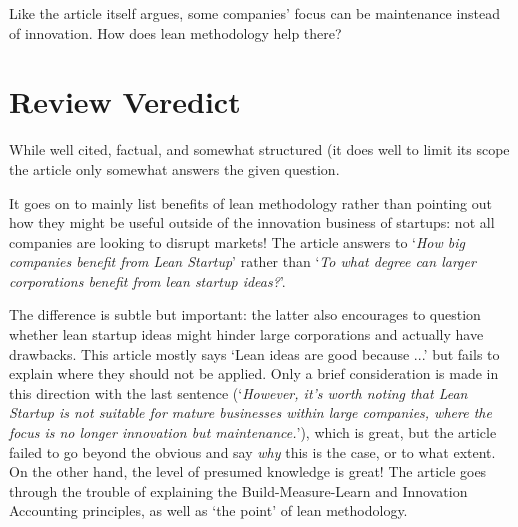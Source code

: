 \documentclass[conference]{IEEEtran}
\begin{document}
    Like the article itself argues, some companies' focus can be maintenance instead
    of innovation.
    How does lean methodology help there? \\

    \section{Review Veredict}

    While well cited, factual, and somewhat structured (it does well to limit its scope the article
    only somewhat answers the given question.

    It goes on to mainly list
    benefits of lean methodology rather than pointing out how they might be useful outside of the
    innovation business of startups: not all companies are looking to disrupt markets!
    The article answers to `\emph{How big companies benefit from Lean Startup}' rather than
    `\emph{To what degree can larger corporations benefit from lean startup ideas?}'.

    The difference is subtle but important: the latter also encourages to question
    whether lean startup ideas might hinder large corporations and actually have drawbacks.
    This article mostly says `Lean ideas are good because ...' but fails to explain
    where they should not be applied.
    Only a brief consideration is made in this direction with the
    last sentence (`\textit{However, it’s worth noting that Lean Startup is not suitable for mature
    businesses within large companies, where the focus is no longer innovation but maintenance.}'),
    which is great, but the article failed to go beyond the obvious and say \emph{why} this is the
    case, or to what extent.\\

    On the other hand, the level of presumed knowledge is great!
    The article goes through the trouble of explaining the Build-Measure-Learn and Innovation
    Accounting principles, as well as `the point' of lean methodology.
\end{document}

